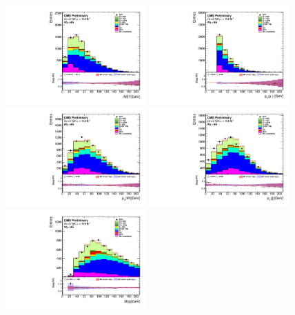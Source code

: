 \begin{figure}[htbp]
	\centering
		\includegraphics[width=0.48\textwidth]{Figures/Results/Muon/postfit/Wbb_GetMET_doQCD1.pdf}
		\includegraphics[width=0.48\textwidth]{Figures/Results/Muon/postfit/Wbb_vLepton_pt_doQCD1.pdf}
		\includegraphics[width=0.48\textwidth]{Figures/Results/Muon/postfit/Wbb_GetWpt_doQCD1.pdf}
		\includegraphics[width=0.48\textwidth]{Figures/Results/Muon/postfit/Wbb_H_pt_doQCD1.pdf}
		\includegraphics[width=0.48\textwidth]{Figures/Results/Muon/postfit/Wbb_H_mass_doQCD1.pdf}

\end{figure}
